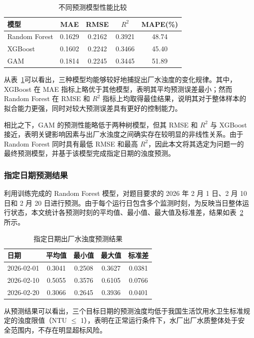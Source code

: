 \documentclass[UTF8,zihao=-4]{ctexart}
\begin{document}
\begin{table}[H]
\centering
\caption{不同预测模型性能比较}
\label{tab:model_compare}
\begin{tabular}{lcccc}
\toprule
模型 & MAE & RMSE & $R^2$ & MAPE(\%) \\
\midrule
Random Forest & 0.1629 & 0.2162 & 0.3921 & 48.74 \\
XGBoost & 0.1602 & 0.2242 & 0.3466 & 45.40 \\
GAM & 0.1814 & 0.2245 & 0.3445 & 51.89 \\
\bottomrule
\end{tabular}
\end{table}

从表~\ref{tab:model_compare}可以看出，三种模型均能够较好地捕捉出厂水浊度的变化规律。其中，XGBoost 在 MAE 指标上略优于其他模型，表明其平均预测误差最小；然而 Random Forest 在 RMSE 和 $R^2$ 指标上均取得最佳结果，说明其对于整体样本的拟合能力更强，同时对较大预测误差具有更好的控制能力。

相比之下，GAM 的预测性能略低于两种树模型，但其 RMSE 和 $R^2$ 与 XGBoost 接近，表明关键影响因素与出厂水浊度之间确实存在较明显的非线性关系。由于 Random Forest 同时具有最低 RMSE 和最高 $R^2$，因此本文将其选定为问题一的最终预测模型，并基于该模型完成指定日期的浊度预测。

\subsubsection{指定日期预测结果}

利用训练完成的 Random Forest 模型，对题目要求的 2026 年 2 月 1 日、2 月 10 日和 2 月 20 日进行预测。由于每个运行日包含多个监测时刻，为反映当日整体运行状态，本文统计各预测时刻的平均值、最小值、最大值及标准差，结果如表~\ref{tab:ntu_prediction} 所示。

\begin{table}[H]
\centering
\caption{指定日期出厂水浊度预测结果}
\label{tab:ntu_prediction}
\begin{tabular}{lcccc}
\toprule
日期 & 平均值 & 最小值 & 最大值 & 标准差 \\
\midrule
2026-02-01 & 0.3041 & 0.2508 & 0.3627 & 0.0381 \\
2026-02-10 & 0.5055 & 0.3576 & 0.6105 & 0.0766 \\
2026-02-20 & 0.3066 & 0.2645 & 0.3936 & 0.0401 \\
\bottomrule
\end{tabular}
\end{table}

从预测结果可以看出，三个目标日期的预测浊度均低于我国生活饮用水卫生标准规定的浊度限值（NTU $\leq$ 1），表明在正常运行条件下，水厂出厂水质整体处于安全范围内，不存在明显超标风险。
\end{document}
